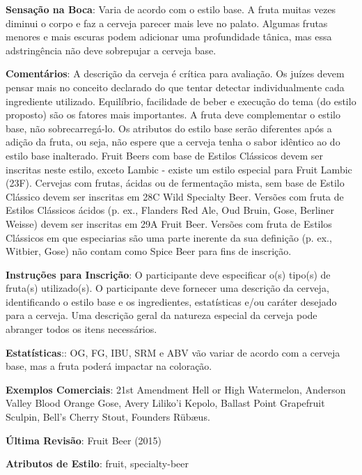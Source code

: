 \textbf{Sensação na Boca}: Varia de acordo com o estilo base. A fruta muitas vezes diminui o corpo e faz a cerveja parecer mais leve no palato. Algumas frutas menores e mais escuras podem adicionar uma profundidade tânica, mas essa adstringência não deve sobrepujar a cerveja base.

\textbf{Comentários}: A descrição da cerveja é crítica para avaliação. Os juízes devem pensar mais no conceito declarado do que tentar detectar individualmente cada ingrediente utilizado. Equilíbrio, facilidade de beber e execução do tema (do estilo proposto) são os fatores mais importantes. A fruta deve complementar o estilo base, não sobrecarregá-lo. Os atributos do estilo base serão diferentes após a adição da fruta, ou seja, não espere que a cerveja tenha o sabor idêntico ao do estilo base inalterado. Fruit Beers com base de Estilos Clássicos devem ser inscritas neste estilo, exceto Lambic - existe um estilo especial para Fruit Lambic (23F). Cervejas com frutas, ácidas ou de fermentação mista, sem base de Estilo Clássico devem ser inscritas em 28C Wild Specialty Beer. Versões com fruta de Estilos Clássicos ácidos (p. ex., Flanders Red Ale, Oud Bruin, Gose, Berliner Weisse) devem ser inscritas em 29A Fruit Beer. Versões com fruta de Estilos Clássicos em que especiarias são uma parte inerente da sua definição (p. ex., Witbier, Gose) não contam como Spice Beer para fins de inscrição.

\textbf{Instruções para Inscrição}: O participante deve especificar o(s) tipo(s) de fruta(s) utilizado(s). O participante deve fornecer uma descrição da cerveja, identificando o estilo base e os ingredientes, estatísticas e/ou caráter desejado para a cerveja. Uma descrição geral da natureza especial da cerveja pode abranger todos os itens necessários.

\textbf{Estatísticas}:: OG, FG, IBU, SRM e ABV vão variar de acordo com a cerveja base, mas a fruta poderá impactar na coloração.

\textbf{Exemplos Comerciais}: 21st Amendment Hell or High Watermelon, Anderson Valley Blood Orange Gose, Avery Liliko'i Kepolo, Ballast Point Grapefruit Sculpin, Bell's Cherry Stout, Founders Rübæus.

\textbf{Última Revisão}: Fruit Beer (2015)

\textbf{Atributos de Estilo}: fruit, specialty-beer
